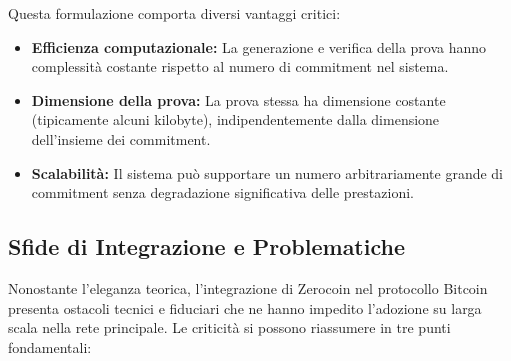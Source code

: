 Questa formulazione comporta diversi vantaggi critici:

\begin{itemize}
    \item \textbf{Efficienza computazionale:} La generazione e verifica della prova hanno complessità costante rispetto al numero di commitment nel sistema.
    \item \textbf{Dimensione della prova:} La prova stessa ha dimensione costante (tipicamente alcuni kilobyte), indipendentemente dalla dimensione dell'insieme dei commitment.
    \item \textbf{Scalabilità:} Il sistema può supportare un numero arbitrariamente grande di commitment senza degradazione significativa delle prestazioni.
\end{itemize}

\subsection{Sfide di Integrazione e Problematiche}

Nonostante l'eleganza teorica, l'integrazione di Zerocoin nel protocollo Bitcoin presenta ostacoli tecnici e fiduciari che ne hanno impedito l'adozione su larga scala nella rete principale. Le criticità si possono riassumere in tre punti fondamentali:

